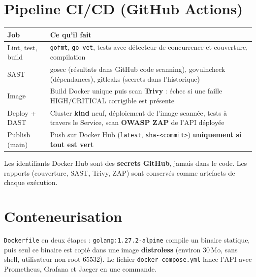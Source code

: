 \documentclass[11pt,a4paper]{article}
\newcommand{\code}[1]{\texttt{\small #1}}
\begin{document}
\section{Pipeline CI/CD (GitHub Actions)}
\begin{tabularx}{\linewidth}{@{}p{3.3cm}X@{}}
\toprule
\textbf{Job} & \textbf{Ce qu'il fait} \\
\midrule
Lint, test, build & \code{gofmt}, \code{go vet}, tests avec détecteur de concurrence et couverture, compilation \\
SAST & gosec (résultats dans GitHub code scanning), govulncheck (dépendances), gitleaks (secrets dans l'historique) \\
Image & Build Docker unique puis scan \textbf{Trivy} : échec si une faille HIGH/CRITICAL corrigible est présente \\
Deploy + DAST & Cluster \textbf{kind} neuf, déploiement de l'image scannée, tests à travers le Service, scan \textbf{OWASP ZAP} de l'API déployée \\
Publish (main) & Push sur Docker Hub (\code{latest}, \code{sha-<commit>}) \textbf{uniquement si tout est vert} \\
\bottomrule
\end{tabularx}

Les identifiants Docker Hub sont des \textbf{secrets GitHub}, jamais dans le code. Les rapports (couverture,
SAST, Trivy, ZAP) sont conservés comme artefacts de chaque exécution.

\section{Conteneurisation}
\code{Dockerfile} en deux étapes : \code{golang:1.27.2-alpine} compile un binaire statique, puis seul ce binaire
est copié dans une image \textbf{distroless} (environ 30\,Mo, sans shell, utilisateur non-root 65532). Le fichier
\code{docker-compose.yml} lance l'API avec Prometheus, Grafana et Jaeger en une commande.
\end{document}
